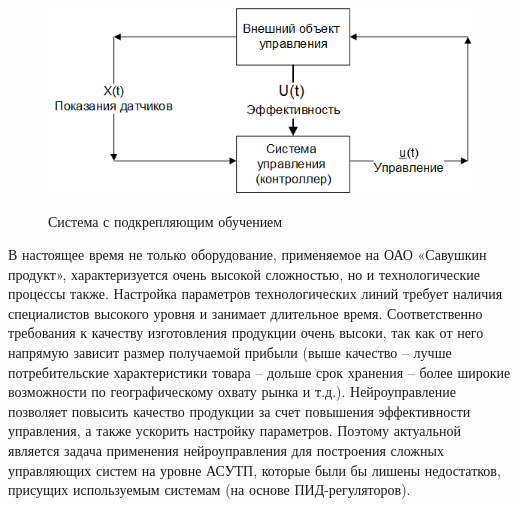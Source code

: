 \begin{figure}[h!]
    \begin{center}
        \includegraphics{images/intro/Система с подкрепляющим обучением.png}\\[2mm]
        \caption{Система с подкрепляющим обучением}\label{fig}
    \end{center}
\end{figure}

В настоящее время не только оборудование, применяемое на ОАО «Савушкин продукт», характеризуется очень высокой сложностью, но и технологические процессы также. Настройка параметров технологических линий требует наличия специалистов высокого уровня и занимает длительное время. Соответственно требования к качеству изготовления продукции очень высоки, так как от него напрямую зависит размер получаемой прибыли (выше качество – лучше потребительские характеристики товара – дольше срок хранения – более широкие возможности по географическому охвату рынка и т.д.). Нейроуправление позволяет повысить качество продукции за счет повышения эффективности управления, а также ускорить настройку параметров. Поэтому актуальной является задача применения нейроуправления для построения сложных управляющих систем на уровне АСУТП, которые были бы лишены недостатков, присущих используемым системам (на основе ПИД-регуляторов).
